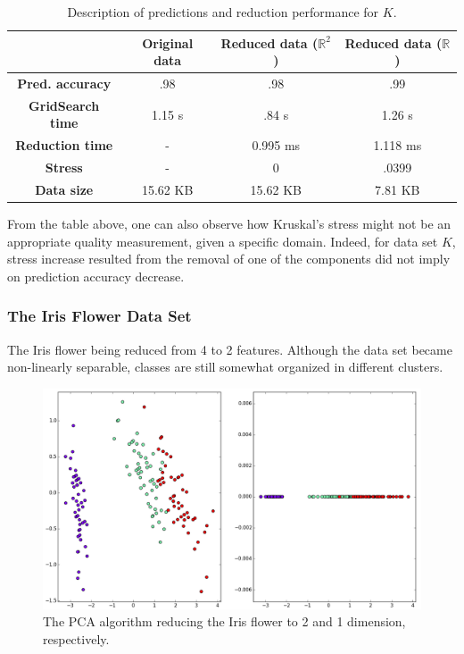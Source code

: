 \documentclass[12pt]{article}
\begin{document}
\begin{table}[H]
	\centering
	\begin{tabular}{|c|c|c|c|}
		\hline
		& \textbf{Original data} & \textbf{Reduced data ($\mathbb{R}^2$)} & \textbf{Reduced data ($\mathbb{R}$)} \\\hline
		\textbf{Pred. accuracy} & .98 & .98 & .99 \\\hline
		\textbf{GridSearch time} & 1.15 s & .84 s & 1.26 s \\\hline
		\textbf{Reduction time} & - & 0.995 ms & 1.118 ms \\\hline
		\textbf{Stress} & - & 0 & .0399 \\\hline
		\textbf{Data size} & 15.62 KB & 15.62 KB & 7.81 KB \\\hline
	\end{tabular}

	\caption{Description of predictions and reduction performance for $K$.}
\end{table}

From the table above, one can also observe how Kruskal's stress might not be an appropriate quality measurement, given a specific domain. Indeed, for data set $K$, stress increase resulted from the removal of one of the components did not imply on prediction accuracy decrease.

\subsubsection{The Iris Flower Data Set}

The Iris flower being reduced from 4 to 2 features. Although the data set became non-linearly separable, classes are still somewhat organized in different clusters.

\begin{figure}[H]
	\centering
	\captionsetup{justification=centering}

	\includegraphics[width=\linewidth]{experiments/1_2_iris_pca}
	\caption{The PCA algorithm reducing the Iris flower to 2 and 1 dimension, respectively.}
	\label{fig:dsirispca}
\end{figure}
\end{document}
